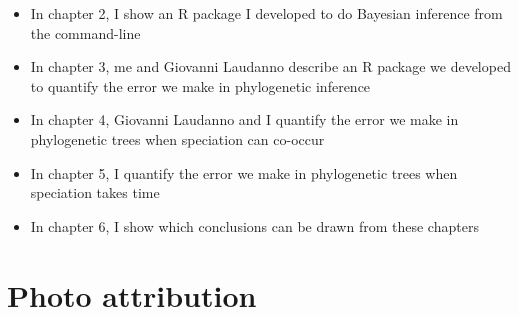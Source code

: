\begin{itemize}
	\item In chapter 2, I show an R package I developed to do Bayesian
    inference from the command-line
	\item In chapter 3, me and Giovanni Laudanno describe an R package we 
    developed to quantify the error we make in phylogenetic inference
	\item In chapter 4, Giovanni Laudanno and I quantify the error we make 
    in phylogenetic trees when speciation can co-occur
	\item In chapter 5, I quantify the error we make 
    in phylogenetic trees when speciation takes time
	\item In chapter 6, I show which conclusions can be drawn from these chapters
\end{itemize}



\chapter{Photo attribution}


